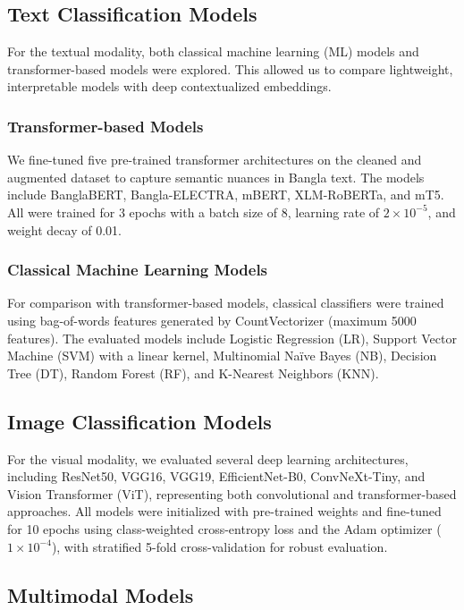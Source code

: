 \documentclass[11pt]{article}
\begin{document}
\subsection{Text Classification Models}

For the textual modality, both classical machine learning (ML) models and transformer-based models were explored. This allowed us to compare lightweight, interpretable models with deep contextualized embeddings.  

\subsubsection{Transformer-based Models}

We fine-tuned five pre-trained transformer architectures on the cleaned and augmented dataset to capture semantic nuances in Bangla text. The models include BanglaBERT, Bangla-ELECTRA, mBERT, XLM-RoBERTa, and mT5. All were trained for 3 epochs with a batch size of 8, learning rate of $2\times10^{-5}$, and weight decay of 0.01.

\subsubsection{Classical Machine Learning Models}

For comparison with transformer-based models, classical classifiers were trained using bag-of-words features generated by CountVectorizer (maximum 5000 features). The evaluated models include Logistic Regression (LR), Support Vector Machine (SVM) with a linear kernel, Multinomial Naïve Bayes (NB), Decision Tree (DT), Random Forest (RF), and K-Nearest Neighbors (KNN).



\subsection{Image Classification Models}

For the visual modality, we evaluated several deep learning architectures, including ResNet50, VGG16, VGG19, EfficientNet-B0, ConvNeXt-Tiny, and Vision Transformer (ViT), representing both convolutional and transformer-based approaches. All models were initialized with pre-trained weights and fine-tuned for 10 epochs using class-weighted cross-entropy loss and the Adam optimizer ($1\times10^{-4}$), with stratified 5-fold cross-validation for robust evaluation.

\subsection{Multimodal Models}
\end{document}
